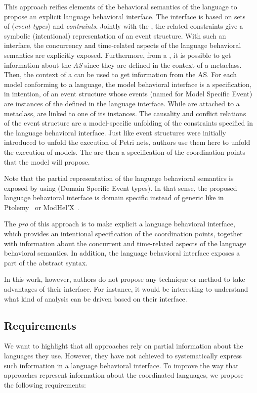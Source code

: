 This approach reifies elements of the behavioral semantics of the language to propose an explicit language behavioral interface. The interface is based on sets of \dse (\emph{event types}) and \emph{contraints}. Jointly with the \dse, the related constraints give a symbolic (intentional) representation of an event structure. With such an interface, the concurrency and time-related aspects of the language behavioral semantics are explicitly exposed.
%
Furthermore, from a \dse, it is possible to get information about the \emph{AS} since they are defined in the context of a metaclass. Then, the context of a \dse can be used to get information from the AS.   
For each model conforming to a language, the model behavioral interface is a specification, in intention, of an event structure whose events (named \mse for Model Specific Event) are instances of the \dse defined in the language interface. While \dse are attached to a metaclass, \mse are linked to one of its instances. The causality and conflict relations of the event structure are a model-specific unfolding of the constraints specified in the language behavioral interface. Just like event structures were initially introduced to unfold the execution of Petri nets, authors use them here to unfold the execution of models. The \dse are then a specification of the coordination points that the model will propose.

Note that the partial representation of the language behavioral semantics is exposed by using \dse (Domain Specific Event types). In that sense, the proposed language behavioral interface is domain specific instead of generic like in Ptolemy~\cite{ptoleframebib} or ModHel'X~\cite{modhelxbib}. 

The \emph{pro} of this approach is to make explicit a language behavioral interface, which provides an intentional specification of the coordination points, together with information about the concurrent and time-related aspects of the language behavioral semantics. In addition, the language behavioral interface exposes a part of the abstract syntax.   

In this work, however, authors do not propose any technique or method to take advantages of their interface. For instance, it would be interesting to understand what kind of analysis can be driven based on their interface.


\subsection{Requirements}
We want to highlight that all approaches rely on partial information about the languages they use. However, they have not achieved to systematically express such information in a language behavioral interface. To improve the way that approaches represent information about the coordinated languages, we propose the following requirements: 

